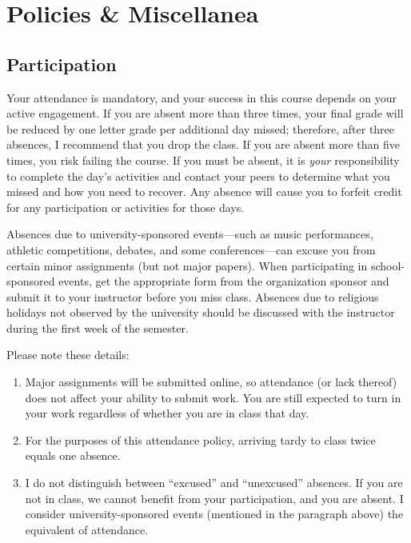 \documentclass[12pt,oneside]{amsart}	%
\begin{document}

 

\section{Policies \& Miscellanea}

\subsection{Participation}
Your attendance is mandatory, and your success in this course depends on your active engagement.  If you are absent more than three times, your final grade will be reduced by one letter grade per additional day missed; therefore, after three absences, I recommend that you drop the class. If you are absent more than five times, you risk failing the course.  If you must be absent, it is \emph{your} responsibility to complete the day's activities and contact your peers to determine what you missed and how you need to recover. Any absence will cause you to forfeit credit for any participation or activities for those days.

Absences due to university-sponsored events---such as music performances, athletic competitions, debates, and some conferences---can excuse you from certain minor assignments (but not major papers). When participating in school-sponsored events, get the appropriate form from the organization sponsor and submit it to your instructor before you miss class. Absences due to religious holidays not observed by the university should be discussed with the instructor during the first week of the semester.

\newpage
Please note these details: 
\begin{enumerate}
	\item Major assignments will be submitted online, so attendance (or lack thereof) does not affect your ability to submit work. You are still expected to turn in your work regardless of whether you are in class that day.
	\item For the purposes of this attendance policy, arriving tardy to class twice equals one absence.
	\item I do not distinguish between ``excused'' and ``unexcused'' absences. If you are not in class, we cannot benefit from your participation, and you are absent. I consider university-sponsored events (mentioned in the paragraph above) the equivalent of attendance.
\end{enumerate}
\end{document}
